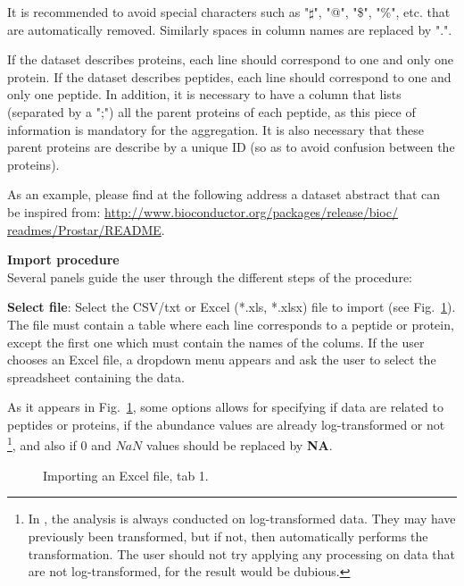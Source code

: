 \documentclass[12pt]{article}
\begin{document}
{It is recommended to avoid special characters such as "$\sharp$", "@", "\$", 
"\%", etc. that are automatically removed. Similarly spaces in column names 
are replaced by ".".

If the dataset describes proteins, each line should correspond to one and 
only one protein. 
If the dataset describes peptides, each line should correspond to one and only 
one peptide. In addition, it is necessary to have a column that lists 
(separated by a ";") all the parent proteins of each peptide, as this piece of 
information is mandatory for the aggregation. It is also necessary that these 
parent proteins are describe by a unique ID (so as to avoid confusion between 
the proteins).

As an example, please find at the following address a dataset abstract that 
can be inspired from: \url{http://www.bioconductor.org/packages/release/bioc/
readmes/Prostar/README}. 


\noindent \textbf{Import procedure}\\
\noindent Several panels guide the user through the different steps of the 
procedure:

\textbf {Select file}: Select the CSV/txt or Excel (*.xls, *.xlsx) file to 
import (see Fig.~\ref{fig:imp1}). The file must contain a table where each line 
corresponds to a peptide or protein, except the first one which must contain 
the names of the colums. 
If the user chooses an Excel file, a dropdown menu appears and ask the user to 
select the spreadsheet containing the data. 

As it appears in Fig.~\ref{fig:imp1}, some options allows for 
specifying if data are related to peptides or proteins, if the abundance values
are already log-transformed or not \footnote{In , the analysis 
is always conducted on log-transformed data. They may have previously been 
transformed, but if not, then  automatically performs the 
transformation. 
The user should not try applying any  processing on data that 
are not log-transformed, for the result would be dubious.}, and also if $0$ 
and $NaN$ values should be replaced by \textbf{NA}. 
\begin {figure}
\centering
{}
\caption{Importing an Excel file, tab 1.}\label{fig:imp1}
\end {figure}

}
\end{document}
